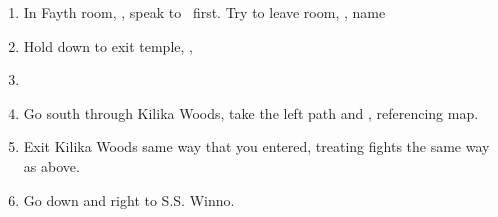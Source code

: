 \begin{enumerate}[resume]
    \item In Fayth room, \sd, speak to \wakka\ first. Try to leave room, \sd, name \ifrit
    \item Hold down to exit temple, \cs[0:40], \sd
    \item \formation{\tidus}{\wakka}{\lulu}
    \item Go south through Kilika Woods, take the left path and , referencing map.
    \item Exit Kilika Woods same way that you entered, treating fights the same way as above.
    \item Go down and right to S.S. Winno. \sd
\end{enumerate}